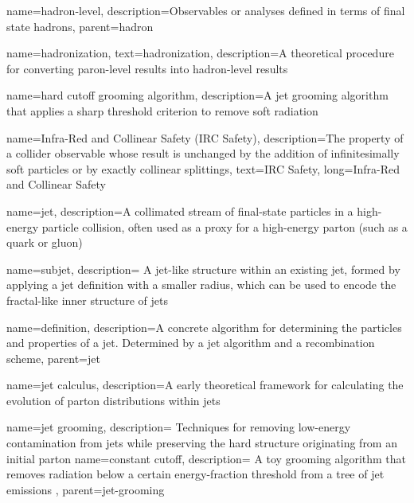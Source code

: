     {
      name=hadron-level,
      description={Observables or analyses defined in terms of final state hadrons},
      parent=hadron
    }


{
  name=hadronization,
  text=hadronization,
  description={A theoretical procedure for converting paron-level results into hadron-level results}
}

{
  name=hard cutoff grooming algorithm,
  description={A jet grooming algorithm that applies a sharp threshold criterion to remove soft radiation}
}


{
    name=Infra-Red and Collinear Safety (IRC Safety),
    description={The property of a collider observable whose result is unchanged by the addition of infinitesimally soft particles or by exactly collinear splittings},
    text={IRC Safety},
    long={Infra-Red and Collinear Safety}
}


{
  name=jet,
  description={A collimated stream of final-state particles in a high-energy particle collision, often used as a proxy for a high-energy parton (such as a quark or gluon)}
}

{
  name=subjet,
  description={
      A jet-like structure within an existing jet, formed by applying a jet definition with a smaller radius, which can be used to encode the fractal-like inner structure of jets
  }
}



{
    name=definition,
    description={A concrete algorithm for determining the particles and properties of a jet.
    Determined by a jet algorithm and a recombination scheme},
    parent=jet
}



{
  name=jet calculus,
  description={A early theoretical framework for calculating the evolution of parton distributions within jets}
}



{
  name=jet grooming,
  description={
      Techniques for removing low-energy contamination from jets while preserving the hard structure originating from an initial parton
  }
}
    {
        name=constant cutoff,
        description={
            A toy grooming algorithm that removes radiation below a certain energy-fraction threshold from a tree of jet emissions
        },
        parent=jet-grooming
    }

